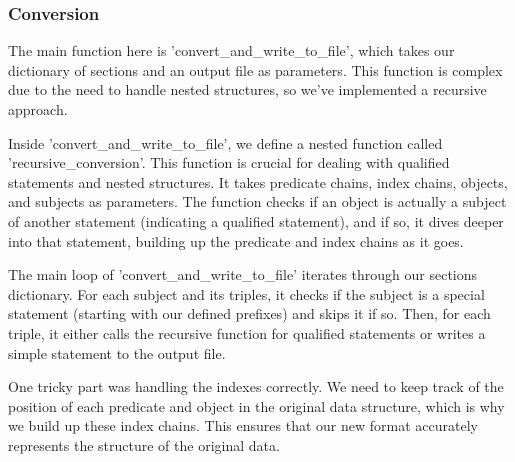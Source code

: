 \subsubsection{Conversion}
The main function here is 'convert\_and\_write\_to\_file', which takes our dictionary of sections and an output file as parameters. This function is complex due to the need to handle nested structures, so we've implemented a recursive approach.

Inside 'convert\_and\_write\_to\_file', we define a nested function called 'recursive\_conversion'. This function is crucial for dealing with qualified statements and nested structures. It takes predicate chains, index chains, objects, and subjects as parameters. The function checks if an object is actually a subject of another statement (indicating a qualified statement), and if so, it dives deeper into that statement, building up the predicate and index chains as it goes.

The main loop of 'convert\_and\_write\_to\_file' iterates through our sections dictionary. For each subject and its triples, it checks if the subject is a special statement (starting with our defined prefixes) and skips it if so. Then, for each triple, it either calls the recursive function for qualified statements or writes a simple statement to the output file.

One tricky part was handling the indexes correctly. We need to keep track of the position of each predicate and object in the original data structure, which is why we build up these index chains. This ensures that our new format accurately represents the structure of the original data.

